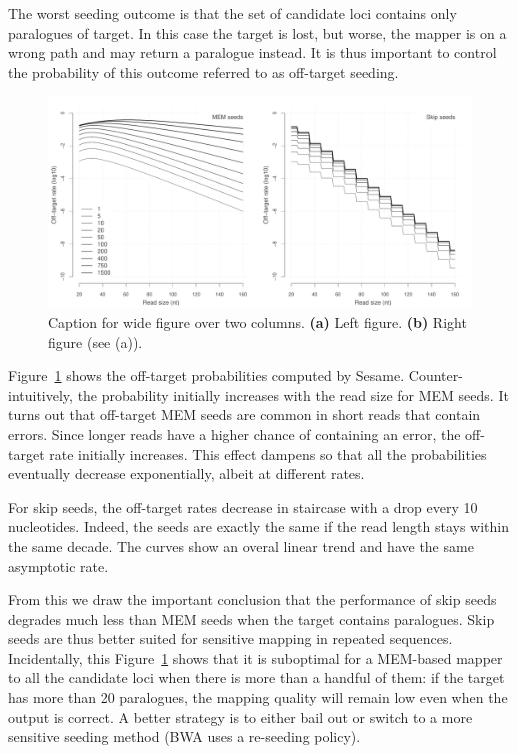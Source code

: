 \documentclass[a4,center,fleqn]{NAR}
\begin{document}
The worst seeding outcome is that the set of candidate loci contains only
paralogues of target. In this case the target is lost, but worse, the
mapper is on a wrong path and may return a paralogue instead. It is thus
important to control the probability of this outcome referred to as
off-target seeding.

\begin{figure}[t]
\begin{center}
\includegraphics[scale=.6]{mortal_kombat.pdf}
\end{center}
\caption{Caption for wide figure over two columns.
\textbf{(a)} Left figure.
\textbf{(b)} Right figure (see (a)).
}
\label{fig_mortal_kombat}
\end{figure}

Figure~\ref{fig_mortal_kombat} shows the off-target probabilities computed
by Sesame. Counter-intuitively, the probability initially increases with
the read size for MEM seeds. It turns out that off-target MEM seeds are
common in short reads that contain errors. Since longer reads have a
higher chance of containing an error, the off-target rate initially
increases. This effect dampens so that all the probabilities eventually
decrease exponentially, albeit at different rates.

For skip seeds, the off-target rates decrease in staircase with a drop
every 10 nucleotides. Indeed, the seeds are exactly the same if the read
length stays within the same decade. The curves show an overal linear
trend and have the same asymptotic rate.

From this we draw the important conclusion that the performance of skip
seeds degrades much less than MEM seeds when the target contains
paralogues. Skip seeds are thus better suited for sensitive mapping in
repeated sequences. Incidentally, this Figure~\ref{fig_mortal_kombat}
shows that it is suboptimal for a MEM-based mapper to all the candidate
loci when there is more than a handful of them: if the target has more
than 20 paralogues, the mapping quality will remain low even when the
output is correct. A better strategy is to either bail out or switch to a
more sensitive seeding method (BWA uses a re-seeding policy).
\end{document}
